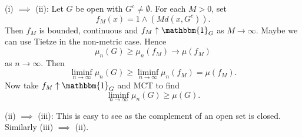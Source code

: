 \documentclass[12pt]{article}
\begin{document}
\begin{proofbox}
	

	(i) $\implies$ (ii): Let $G$ be open with $G^{c} \neq \emptyset$. For each $M > 0$, set
	\[
	f_M(x) = 1 \wedge(M d(x, G^{c})).
	\]
	Then $f_M$ is bounded, continuous and $f_M \uparrow \mathbbm{1}_{G}$ as $M \to \infty$. Maybe we can use Tietze in the non-metric case. Hence
	\[
	\mu_n(G) \geq \mu_n(f_M) \to \mu(f_M)
	\]
	as $n \to \infty$. Then
	\[
	\liminf_{n \to \infty} \mu_n(G) \geq \liminf_{n \to \infty} \mu_n(f_M) = \mu(f_M).
	\]
	Now take $f_M \uparrow \mathbbm{1}_{G}$ and MCT to find
	\[
	\liminf_{n \to \infty} \mu_n(G) \geq \mu(G).
	\]

	(ii) $\implies$ (iii): This is easy to see as the complement of an open set is closed. Similarly (iii) $\implies$ (ii).
\end{proofbox}


\newpage

\printindex
\end{document}
